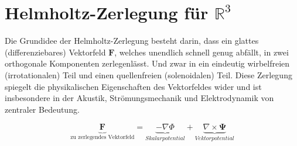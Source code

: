 %
%
%
%
\section{Helmholtz-Zerlegung für $\mathbb{R}^3$
\label{helmholtz:section:teil2}}

Die Grundidee der Helmholtz-Zerlegung besteht darin, dass ein glattes (differenziebares) Vektorfeld $\mathbf{F}$, welches unendlich schnell genug abfällt, in zwei orthogonale Komponenten zerlegenlässt. Und zwar in ein eindeutig wirbelfreien (irrotationalen) Teil und einen quellenfreien (solenoidalen) Teil. Diese Zerlegung spiegelt die physikalischen Eigenschaften des Vektorfeldes wider und ist insbesondere in der Akustik, Strömungsmechanik und Elektrodynamik von zentraler Bedeutung.

\begin{equation}
\underbrace{\mathbf{F}}_{\text{zu zerlegendes Vektorfeld}} =  \underbrace{-\nabla \Phi}_{Skalarpotential} + \underbrace{\nabla \times \mathbf{\Psi}}_{Vektorpotential}
\label{helmholtz:equationAllgemein}
\end{equation}

